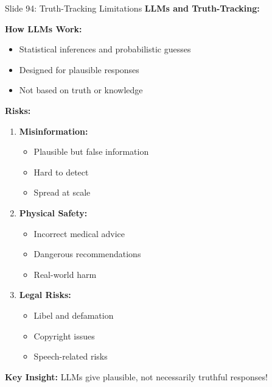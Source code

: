 \documentclass[8pt]{beamer}
\begin{document}
	\begin{frame}{Slide 94: Truth-Tracking Limitations}
		\fontsize{6.5}{7.5}\selectfont
		\textbf{LLMs and Truth-Tracking:}
		
		\vspace{0.1cm}
		\textbf{How LLMs Work:}
		\begin{itemize}
			\item Statistical inferences and probabilistic guesses
			\item Designed for plausible responses
			\item Not based on truth or knowledge
		\end{itemize}
		
		\vspace{0.1cm}
		\textbf{Risks:}
		\begin{enumerate}
			\item \textbf{Misinformation:}
			\begin{itemize}
				\item Plausible but false information
				\item Hard to detect
				\item Spread at scale
			\end{itemize}
			\item \textbf{Physical Safety:}
			\begin{itemize}
				\item Incorrect medical advice
				\item Dangerous recommendations
				\item Real-world harm
			\end{itemize}
			\item \textbf{Legal Risks:}
			\begin{itemize}
				\item Libel and defamation
				\item Copyright issues
				\item Speech-related risks
			\end{itemize}
		\end{enumerate}
		
		\textcolor{myblue}{\textbf{Key Insight:}} LLMs give \textcolor{myblue}{plausible, not necessarily truthful} responses!
	\end{frame}
	
\end{document}
